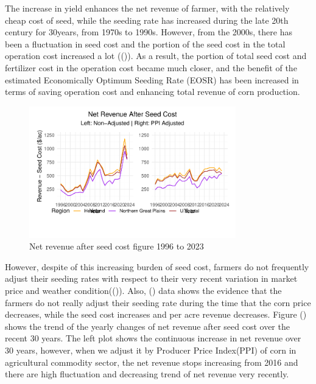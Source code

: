\documentclass[
]{article}
\begin{document}
The increase in yield enhances the net revenue of farmer, with the
relatively cheap cost of seed, while the seeding rate has increased
during the late 20th century for 30years, from 1970s to 1990s. However,
from the 2000s, there has been a fluctuation in seed cost and the
portion of the seed cost in the total operation cost increased a lot
(()). As a result, the portion of
total seed cost and fertilizer cost in the operation cost became much
closer, and the benefit of the estimated Economically Optimum Seeding
Rate (EOSR) has been increased in terms of saving operation cost and
enhancing total revenue of corn production.

\begin{figure}[H]

{\centering \includegraphics[width=0.8\textwidth,height=0.8\textheight]{corn_seed_response_writing_files/figure-pdf/fig1-rev-seed-comb-1.pdf}

}

\caption{Net revenue after seed cost figure 1996 to 2023}

\end{figure}%

However, despite of this increasing burden of seed cost, farmers do not
frequently adjust their seeding rates with respect to their very recent
variation in market price and weather
condition(()). Also,
() data shows the evidence that the farmers do
not really adjust their seeding rate during the time that the corn price
decreases, while the seed cost increases and per acre revenue decreases.
Figure ()
shows the trend of the yearly changes of net revenue after seed cost
over the recent 30 years. The left plot shows the continuous increase in
net revenue over 30 years, however, when we adjust it by Producer Price
Index(PPI) of corn in agricultural commodity sector, the net revenue
stops increasing from 2016 and there are high fluctuation and decreasing
trend of net revenue very recently.
\end{document}
